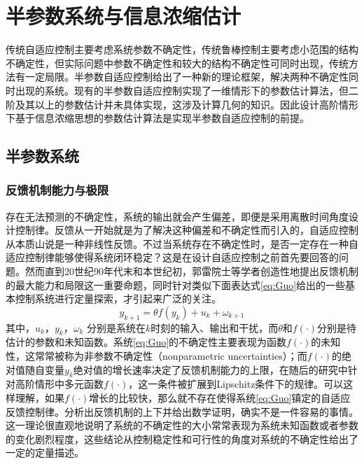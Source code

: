 \chapter{半参数系统与信息浓缩估计}
\label{chap:2}

传统自适应控制主要考虑系统参数不确定性，传统鲁棒控制主要考虑小范围的结构不确定性，但实际问题中参数不确定性和较大的结构不确定性可同时出现，传统方法有一定局限。半参数自适应控制给出了一种新的理论框架，解决两种不确定性同时出现的系统。现有的半参数自适应控制实现了一维情形下的参数估计算法，但二阶及其以上的参数估计并未具体实现，这涉及计算几何的知识。因此设计高阶情形下基于信息浓缩思想的参数估计算法是实现半参数自适应控制的前提。

\section{半参数系统}
\subsection{反馈机制能力与极限}

存在无法预测的不确定性，系统的输出就会产生偏差，即便是采用离散时间角度设计控制律。反馈从一开始就是为了解决这种偏差和不确定性而引入的，自适应控制从本质山说是一种非线性反馈。不过当系统存在不确定性时，是否一定存在一种自适应控制律能够使得系统闭环稳定？这是在设计自适应控制之前首先要回答的问题。然而直到20世纪90年代末和本世纪初，郭雷院士等学者创造性地提出反馈机制的最大能力和局限这一重要命题，同时针对类似下面表达式\eqref{eq:Guo}给出的一些基本控制系统进行定量探索，才引起来广泛的关注。
\begin{equation}%
\label{eq:Guo}
y_{k+1} = \theta f(y_{k}) + u_{k} + \omega_{k+1}
\end{equation}
其中，$u_{k}$，$y_{k}$，$\omega_{k}$ 分别是系统在$k$时刻的输入、输出和干扰，而$\theta$和$f(\cdot)$分别是待估计的参数和未知函数。系统\eqref{eq:Guo}的不确定性主要表现为函数$f(\cdot)$的未知性，这常常被称为非参数不确定性（nonparametric uncertainties）；而$f(\cdot)$的绝对值随自变量$y_{k}$绝对值的增长速率决定了反馈机制能力的上限，在随后的研究中针对高阶情形中多元函数$f(\cdot)$，这一条件被扩展到Lipschitz条件下的规律。可以这样理解，如果$f(\cdot)$增长的比较快，那么就不存在使得系统\eqref{eq:Guo}镇定的自适应反馈控制律。分析出反馈机制的上下并给出数学证明，确实不是一件容易的事情。这一理论很直观地说明了系统的不确定性的大小常常表现为系统未知函数或者参数的变化剧烈程度，这些结论从控制稳定性和可行性的角度对系统的不确定性给出了一定的定量描述。

